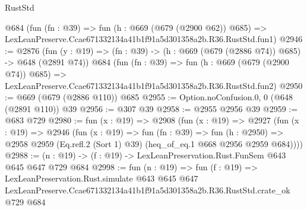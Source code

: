 \begin{lexlean}{RustStd}
\begin{coremodule}
    @684
    (fun (fn : @39) =>
    fun (h : @669 (@679 (@2900 @62)) @685) =>
    LexLeanPreserve.Ccae671332134a41b1f91a5d301358a2b.R36.RustStd.fun1)
@2946 := @2876
    (fun (y : @19) => (fn : @39) -> (h : @669 (@679 (@2886 @74)) @685) -> @648 (@2891 @74))
    @684
    (fun (fn : @39) =>
    fun (h : @669 (@679 (@2900 @74)) @685) =>
    LexLeanPreserve.Ccae671332134a41b1f91a5d301358a2b.R36.RustStd.fun2)
@2950 := @669 (@679 (@2886 @110)) @685
@2955 := Option.noConfusion.{0, 0} (@648 (@2891 @110)) @39
@2956 := @307 @39
@2958 := @2955 @2956 @39
@2959 := @683 @729
@2980 := fun (x : @19) =>
  @2908
    (fun (x : @19) =>
    @2927
      (fun (x : @19) =>
      @2946
        (fun (x : @19) =>
        fun (fn : @39) =>
        fun (h : @2950) =>
        @2958 @2959 (Eq.refl.{2} (Sort 1) @39) (heq_of_eq.{1} @668 @2956 @2959 @684))))
@2988 := (n : @19) -> (f : @19) -> LexLeanPreservation.Rust.FunSem @643 @645 @647 @729 @684
@2998 := fun (n : @19) =>
  fun (f : @19) =>
  LexLeanPreservation.Rust.simulate
    @643
    @645
    @647
    LexLeanPreserve.Ccae671332134a41b1f91a5d301358a2b.R36.RustStd.crate_ok
    @729
    @684
\end{coremodule}
\end{lexlean}
